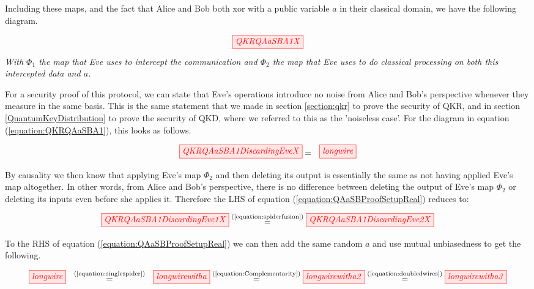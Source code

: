 \documentclass[]{article}
\newcommand{\equaltext}[1]{\ensuremath{\stackrel{\text{#1}}{=}}}
\begin{document}
Including these maps, and the fact that Alice and Bob both xor with a public variable $a$ in their classical domain, we have the following diagram.

\begin{equation}
	\label{equation:QKRQAaSBA1}
	\tikzfig{QKRQAaSBA1X}
\end{equation}
\textit{With $\Phi_1$ the map that Eve uses to intercept the communication and $\Phi_2$ the map that Eve uses to do classical processing on both this intercepted data and $a$.}

For a security proof of this protocol, we can state that Eve's operations introduce no noise from Alice and Bob's perspective whenever they measure in the same basis. This is the same statement that we made in section \ref{section:qkr} to prove the security of QKR, and in section \ref{QuantumKeyDistribution} to prove the security of QKD, where we referred to this as the 'noiseless case'. For the diagram in equation (\ref{equation:QKRQAaSBA1}), this looks as follows.

\begin{equation}
\label{equation:QAaSBProofSetupReal}
\tikzfig{QKRQAaSBA1DiscardingEveX} = ~~ \tikzfig{longwire}
\end{equation}

By causality we then know that applying Eve's map $\Phi_2$ and then deleting its output is essentially the same as not having applied Eve's map altogether. In other words, from Alice and Bob's perspective, there is no difference between deleting the output of Eve's map $\Phi_2$ or deleting its inputs even before she applies it. Therefore the LHS of equation (\ref{equation:QAaSBProofSetupReal}) reduces to:

\begin{equation}
\label{equation:QKRQAaSBA1DiscardingEve1}
\tikzfig{QKRQAaSBA1DiscardingEve1X} \equaltext{(\ref{equation:spiderfusion})} \tikzfig{QKRQAaSBA1DiscardingEve2X} 
\end{equation}

To the RHS of equation (\ref{equation:QAaSBProofSetupReal}) we can then add the same random $a$ and use mutual unbiasedness to get the following.

\begin{equation}
	\label{equation:longwiremanipulation}
	\tikzfig{longwire} ~~ \equaltext{(\ref{equation:singlespider})} ~~
	\tikzfig{longwirewitha} \equaltext{(\ref{equation:Complementarity})}
	\tikzfig{longwirewitha2} \equaltext{(\ref{equation:doubledwires})}
	\tikzfig{longwirewitha3}
\end{equation}
\end{document}
